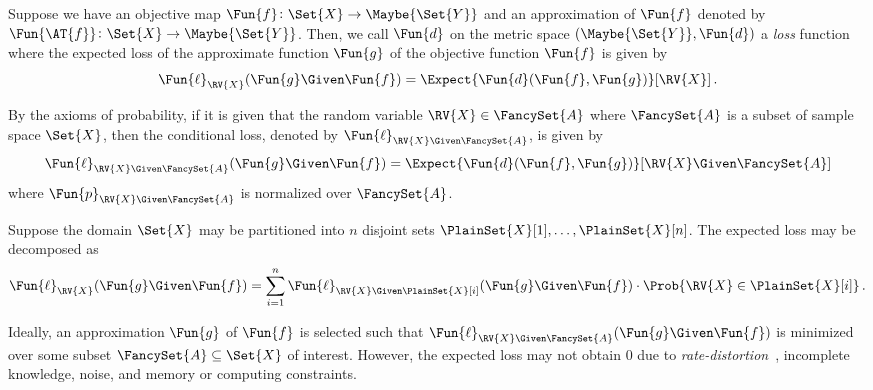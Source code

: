 \documentclass[ ../main.tex]{subfiles}
\begin{document}
Suppose we have an objective map $\Fun{f} \colon \Set{X} \to \Maybe{\Set{Y}}$ and an approximation of $\Fun{f}$ denoted by $\Fun{\AT{f}} \colon \Set{X} \to \Maybe{\Set{Y}}$.
Then, we call $\Fun{d}$ on the metric space $(\Maybe{\Set{Y}},\Fun{d})$ a \emph{loss} function where the expected loss of the approximate function $\Fun{g}$ of the objective function $\Fun{f}$ is given by
\begin{equation}
\label{eq:loss}
\Fun{\ell}_{\RV{X}}(\Fun{g} \Given \Fun{f}) = \Expect{\Fun{d}(\Fun{f},\Fun{g})}[\RV{X}]\,.
\end{equation}

By the axioms of probability, if it is given that the random variable $\RV{X} \in \FancySet{A}$ where $\FancySet{A}$ is a subset of sample space $\Set{X}$, then the conditional loss, denoted by $\Fun{\ell}_{\RV{X} \Given \FancySet{A}}$, is given by
\begin{equation}
\label{eq:cond_loss}
\Fun{\ell}_{\RV{X} \Given \FancySet{A}}(\Fun{g} \Given \Fun{f}) = \Expect{\Fun{d}(\Fun{f},\Fun{g})}[\RV{X} \Given \FancySet{A}]
\end{equation}
where $\Fun{p}_{\RV{X} \Given \FancySet{A}}$ is normalized over $\FancySet{A}$.

Suppose the domain $\Set{X}$ may be partitioned into $n$ disjoint sets $\PlainSet{X}[1],\ldots,\PlainSet{X}[n]$.
The expected loss may be decomposed as
\begin{equation}
\label{eq:disj_loss}
\Fun{\ell}_{\RV{X}}(\Fun{g} \Given \Fun{f}) =
\sum_{i=1}^{n} \Fun{\ell}_{\RV{X} \Given \PlainSet{X}[i]}(\Fun{g} \Given \Fun{f}) \cdot \Prob{\RV{X} \in \PlainSet{X}[i]}\,.
\end{equation}

Ideally, an approximation $\Fun{g}$ of $\Fun{f}$ is selected such that $\Fun{\ell}_{\RV{X} \Given \FancySet{A}}(\Fun{g} \Given \Fun{f})$ is minimized over some subset $\FancySet{A} \subseteq \Set{X}$ of interest.
However, the expected loss may not obtain $0$ due to \emph{rate-distortion}~\cite{shannon1959,cover2006}, incomplete knowledge, noise, and memory or computing constraints.
\end{document}
